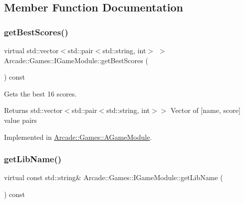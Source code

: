 \subsection{Member Function Documentation}
\mbox{\label{classArcade_1_1Games_1_1IGameModule_afaec4931b0051ba589fbe1b14d20131b}} 
\subsubsection{\texorpdfstring{getBestScores()}{getBestScores()}}
{\footnotesize\ttfamily virtual std\+::vector$<$std\+::pair$<$std\+::string, int$>$ $>$ Arcade\+::\+Games\+::\+I\+Game\+Module\+::get\+Best\+Scores (\begin{DoxyParamCaption}{ }\end{DoxyParamCaption}) const\hspace{0.3cm}{\ttfamily [pure virtual]}}



Gets the best 16 scores. 

\begin{DoxyReturn}{Returns}
std\+::vector$<$std\+::pair$<$std\+::string, int$>$$>$ Vector of \mbox{[}name, score\mbox{]} value pairs 
\end{DoxyReturn}


Implemented in \mbox{\hyperlink{classArcade_1_1Games_1_1AGameModule_aaebba3bd5236f97cb18867fe99c7135b}{Arcade\+::\+Games\+::\+A\+Game\+Module}}.

\mbox{\label{classArcade_1_1Games_1_1IGameModule_a30966cbaa00abbd2a211cf152ea595f2}} 
\subsubsection{\texorpdfstring{getLibName()}{getLibName()}}
{\footnotesize\ttfamily virtual const std\+::string\& Arcade\+::\+Games\+::\+I\+Game\+Module\+::get\+Lib\+Name (\begin{DoxyParamCaption}{ }\end{DoxyParamCaption}) const\hspace{0.3cm}{\ttfamily [pure virtual]}}



